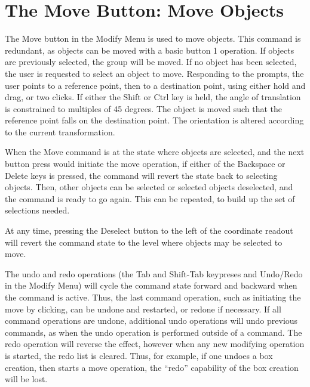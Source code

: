 \section{The {\cb Move} Button: Move Objects}
The {\cb Move} button in the {\cb Modify Menu} is used to move
objects.  This command is redundant, as objects can be moved with a
basic button 1 operation.  If objects are previously selected, the
group will be moved.  If no object has been selected, the user is
requested to select an object to move.  Responding to the prompts, the
user points to a reference point, then to a destination point, using
either hold and drag, or two clicks.  If either the {\kb Shift} or
{\kb Ctrl} key is held, the angle of translation is constrained to
multiples of 45 degrees.  The object is moved such that the reference
point falls on the destination point.  The orientation is altered
according to the current transformation.

When the {\cb Move} command is at the state where objects are
selected, and the next button press would initiate the move operation,
if either of the {\kb Backspace} or {\kb Delete} keys is pressed, the
command will revert the state back to selecting objects.  Then, other
objects can be selected or selected objects deselected, and the
command is ready to go again.  This can be repeated, to build up the
set of selections needed.

At any time, pressing the {\cb Deselect} button to the left of the
coordinate readout will revert the command state to the level where
objects may be selected to move.

The undo and redo operations (the {\kb Tab} and {\kb Shift-Tab}
keypreses and {\cb Undo}/{\cb Redo} in the {\cb Modify Menu}) will
cycle the command state forward and backward when the command is
active.  Thus, the last command operation, such as initiating the
move by clicking, can be undone and restarted, or redone if
necessary.  If all command operations are undone, additional undo
operations will undo previous commands, as when the undo operation is
performed outside of a command.  The redo operation will reverse the
effect, however when any new modifying operation is started, the redo
list is cleared.  Thus, for example, if one undoes a box creation,
then starts a move operation, the ``redo'' capability of the box
creation will be lost.

